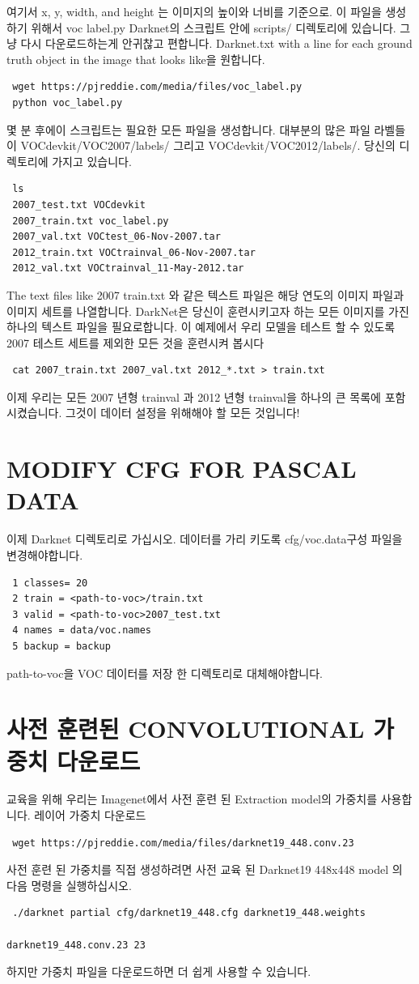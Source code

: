 \documentclass{article}
\begin{document}
여기서 x, y, width, and height 는 이미지의 높이와 너비를 기준으로. 이 파일을 생성하기 위해서
voc label.py Darknet의 스크립트 안에 scripts/ 디렉토리에 있습니다.
그냥 다시 다운로드하는게 안귀찮고 편합니다.
Darknet.txt with a line for each ground truth object in the image that looks like을 원합니다.
\begin{lstlisting}
 wget https://pjreddie.com/media/files/voc_label.py 
 python voc_label.py 
\end{lstlisting}
몇 분 후에이 스크립트는 필요한 모든 파일을 생성합니다. 대부분의 많은 파일 라벨들이 VOCdevkit/VOC2007/labels/ 그리고 VOCdevkit/VOC2012/labels/. 당신의 디렉토리에 가지고 있습니다.
\begin{lstlisting}
 ls 
 2007_test.txt VOCdevkit 
 2007_train.txt voc_label.py 
 2007_val.txt VOCtest_06-Nov-2007.tar 
 2012_train.txt VOCtrainval_06-Nov-2007.tar 
 2012_val.txt VOCtrainval_11-May-2012.tar 
\end{lstlisting}
The text files like 2007 train.txt 와 같은 텍스트 파일은 해당 연도의 이미지 파일과 이미지 세트를 나열합니다. 
DarkNet은 당신이 훈련시키고자 하는 모든 이미지를 가진 하나의 텍스트 파일을 필요로합니다. 이 예제에서
우리 모델을 테스트 할 수 있도록 2007 테스트 세트를 제외한 모든 것을 훈련시켜 봅시다
\begin{lstlisting}
 cat 2007_train.txt 2007_val.txt 2012_*.txt > train.txt 
\end{lstlisting}

이제 우리는 모든 2007 년형 trainval 과 2012 년형 trainval을 하나의 큰 목록에 포함 시켰습니다. 그것이 데이터 설정을 위해해야 할 모든 것입니다!
\section{MODIFY CFG FOR PASCAL DATA}
이제 Darknet 디렉토리로 가십시오. 데이터를 가리 키도록 cfg/voc.data구성 파일을 변경해야합니다.
\begin{lstlisting}
 1 classes= 20 
 2 train = <path-to-voc>/train.txt 
 3 valid = <path-to-voc>2007_test.txt 
 4 names = data/voc.names 
 5 backup = backup 
\end{lstlisting}
\textlangle path-to-voc\textrangle 을 VOC 데이터를 저장 한 디렉토리로 대체해야합니다.
\section{사전 훈련된 CONVOLUTIONAL 가중치 다운로드}
교육을 위해 우리는 Imagenet에서 사전 훈련 된 Extraction model의 가중치를 사용합니다.
레이어 가중치 다운로드 
\begin{lstlisting}
 wget https://pjreddie.com/media/files/darknet19_448.conv.23 
\end{lstlisting}
사전 훈련 된 가중치를 직접 생성하려면 사전 교육 된 Darknet19 448x448 model 의 다음 명령을 실행하십시오.
\begin{lstlisting}
 ./darknet partial cfg/darknet19_448.cfg darknet19_448.weights 
                                                      darknet19_448.conv.23 23 
\end{lstlisting}
하지만 가중치 파일을 다운로드하면 더 쉽게 사용할 수 있습니다.
\end{document}
